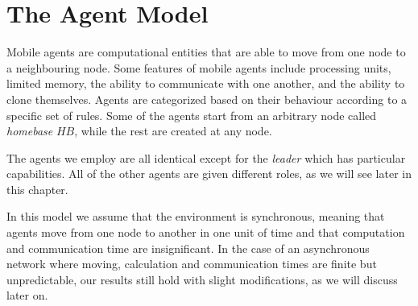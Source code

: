 


\section{The Agent Model} 


Mobile agents are computational entities that are able to move from one node to a neighbouring node. Some features of mobile agents include processing units, limited memory, the ability to communicate with one another, and the ability to clone themselves. Agents are categorized based on their behaviour according to a specific set of rules. Some of the agents start from an arbitrary node called  {\em homebase} $HB$,  while the rest  are created  at any node. 
  
  The agents we employ are all identical except for the {\em leader} which has particular capabilities. All of the other agents are given different roles, as we will see later in this chapter. 

In this model we assume that the environment is synchronous, meaning that agents move from one node to another in one unit of time and that computation and communication time are insignificant. In the case of an asynchronous network where moving, calculation and communication times are finite but unpredictable, our results still hold with slight modifications, as we will discuss later on.




